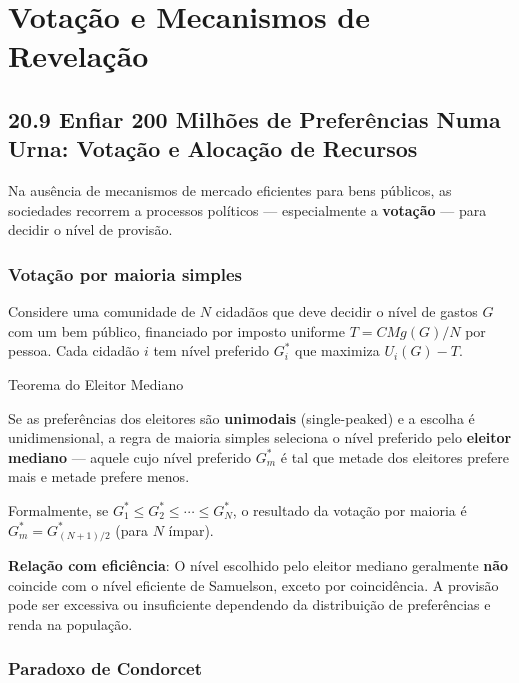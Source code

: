 \documentclass[11pt,twoside,openright]{book}
\begin{document}
\chapter{Votação e Mecanismos de
Revelação}\label{votauxe7uxe3o-e-mecanismos-de-revelauxe7uxe3o}

\section{20.9 Enfiar 200 Milhões de Preferências Numa Urna: Votação e
Alocação de Recursos}\label{209}

Na ausência de mecanismos de mercado eficientes para bens públicos, as
sociedades recorrem a processos políticos --- especialmente a
\textbf{votação} --- para decidir o nível de provisão.

\subsection{Votação por maioria
simples}\label{votauxe7uxe3o-por-maioria-simples}

Considere uma comunidade de \(N\) cidadãos que deve decidir o nível de
gastos \(G\) com um bem público, financiado por imposto uniforme
\(T = CMg(G)/N\) por pessoa. Cada cidadão \(i\) tem nível preferido
\(G_i^*\) que maximiza \(U_i(G) - T\).

\begin{theorembox}{Teorema do Eleitor Mediano}

Se as preferências dos eleitores são \textbf{unimodais} (single-peaked)
e a escolha é unidimensional, a regra de maioria simples seleciona o
nível preferido pelo \textbf{eleitor mediano} --- aquele cujo nível
preferido \(G_m^*\) é tal que metade dos eleitores prefere mais e metade
prefere menos.

Formalmente, se \(G_1^* \leq G_2^* \leq \cdots \leq G_N^*\), o resultado
da votação por maioria é \(G_m^* = G_{(N+1)/2}^*\) (para \(N\) ímpar).

\end{theorembox}

\textbf{Relação com eficiência}: O nível escolhido pelo eleitor mediano
geralmente \textbf{não} coincide com o nível eficiente de Samuelson,
exceto por coincidência. A provisão pode ser excessiva ou insuficiente
dependendo da distribuição de preferências e renda na população.

\subsection{Paradoxo de Condorcet}\label{paradoxo-de-condorcet}
\end{document}
